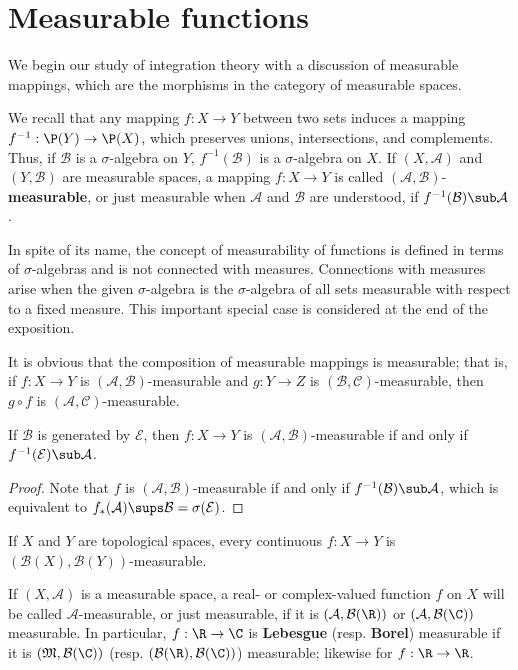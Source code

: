 \section{Measurable functions}
We begin our study of integration theory with a discussion of measurable mappings, which are the morphisms in the category of measurable spaces.\par
We recall that any mapping $f:X\to Y$ between two sets induces a mapping $f^{-1}:\P(Y)\to\P(X)$, which preserves unions, intersections, and complements. Thus, if $\mathcal{B}$ is a $\sigma$-algebra on $Y$, $f^{-1}(\mathcal{B})$ is a $\sigma$-algebra on $X$. If $(X,\mathcal{A})$ and $(Y,\mathcal{B})$ are measurable spaces, a mapping $f:X\to Y$ is called $(\mathcal{A},\mathcal{B})$-\textbf{measurable}, or just measurable when $\mathcal{A}$ and $\mathcal{B}$ are understood, if $f^{-1}(\mathcal{B})\sub\mathcal{A}$.\par
In spite of its name, the concept of measurability of functions is defined in terms of $\sigma$-algebras and is not connected with measures. Connections with measures arise when the given $\sigma$-algebra is the $\sigma$-algebra of all sets measurable with respect to a fixed measure. This important special case is considered at the end of the exposition.\par
It is obvious that the composition of measurable mappings is measurable; that is, if $f:X\to Y$ is $(\mathcal{A},\mathcal{B})$-measurable and $g:Y\to Z$ is $(\mathcal{B},\mathcal{C})$-measurable, then $g\circ f$ is $(\mathcal{A},\mathcal{C})$-measurable.
\begin{proposition}\label{measurable iff generating set}
If $\mathcal{B}$ is generated by $\mathcal{E}$, then $f:X\to Y$ is $(\mathcal{A},\mathcal{B})$-measurable if and only if $f^{-1}(\mathcal{E})\sub\mathcal{A}$.
\end{proposition}
\begin{proof}
Note that $f$ is $(\mathcal{A},\mathcal{B})$-measurable if and only if $f^{-1}(\mathcal{B})\sub\mathcal{A}$, which is equivalent to $f_*(\mathcal{A})\sups\mathcal{B}=\sigma(\mathcal{E})$.
\end{proof}
\begin{corollary}
If $X$ and $Y$ are topological spaces, every continuous $f:X\to Y$ is $(\mathcal{B}(X),\mathcal{B}(Y))$-measurable.
\end{corollary}
If $(X,\mathcal{A})$ is a measurable space, a real- or complex-valued function $f$ on $X$ will be called $\mathcal{A}$-measurable, or just measurable, if it is $(\mathcal{A},\mathcal{B}(\R))$ or $(\mathcal{A},\mathcal{B}(\C))$ measurable. In particular, $f:\R\to\C$ is \textbf{Lebesgue} (resp. \textbf{Borel}) measurable if it is $(\mathfrak{M},\mathcal{B}(\C))$ (resp. $(\mathcal{B}(\R),\mathcal{B}(\C))$) measurable; likewise for $f:\R\to\R$.
